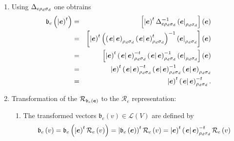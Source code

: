 \documentclass[aps,preprint]{revtex4}
\begin{document}
\begin{enumerate}
\item Using ${\Large \Delta }_{e\rho _{d}\sigma _{d}}$ one obtrains 
\begin{eqnarray}
\mathfrak{b}_{e}\left( \left\vert \boldsymbol{e}\right) ^{t}\right) &=&\left[
\left\vert \boldsymbol{e}\right) ^{t}{\large \Delta }_{e\rho _{d}\sigma
_{d}}^{\boldsymbol{-}1}\left( \boldsymbol{e}\right\vert _{\rho _{d}\sigma
_{d}}\right] \left( \boldsymbol{e}\right) \\
&=&\left[ \left\vert \boldsymbol{e}\right) ^{t}\left( \left( \left. 
\boldsymbol{e}\right\vert \boldsymbol{e}\right) _{\rho _{d}\sigma
_{d}}\left( \left. \boldsymbol{e}\right\vert \boldsymbol{e}\right) _{\rho
_{d}\sigma _{d}}^{t}\right) ^{-1}\left( \boldsymbol{e}\right\vert _{\rho
_{d}\sigma _{d}}\right] \left( \boldsymbol{e}\right) \\
&=&\left[ \left\vert \boldsymbol{e}\right) ^{t}\left( \left. \boldsymbol{e}%
\right\vert \boldsymbol{e}\right) _{\rho _{d}\sigma _{d}}^{-t}\left( \left. 
\boldsymbol{e}\right\vert \boldsymbol{e}\right) _{\rho _{d}\sigma
_{d}}^{-1}\left( \boldsymbol{e}\right\vert _{\rho _{d}\sigma _{d}}\right]
\left( \boldsymbol{e}\right) \\
&=&\left\vert \boldsymbol{e}\right) ^{t}\left( \left. \boldsymbol{e}%
\right\vert \boldsymbol{e}\right) _{\rho _{d}\sigma _{d}}^{-t}\left( \left. 
\boldsymbol{e}\right\vert \boldsymbol{e}\right) _{\rho _{d}\sigma
_{d}}^{-1}\left( \left. \boldsymbol{e}\right\vert \boldsymbol{e}\right)
_{\rho _{d}\sigma _{d}} \\
&=&\left\vert \boldsymbol{e}\right) ^{t}\left( \left. \boldsymbol{e}%
\right\vert \boldsymbol{e}\right) _{\rho _{d}\sigma _{d}}^{-t}.
\end{eqnarray}

\item Transformation of the $\mathcal{R}_{\mathfrak{b}_{e}\left( \boldsymbol{%
e}\right) }$ to the $\mathcal{R}_{e}$ representation:

\begin{enumerate}
\item The transformed vectors $\mathfrak{b}_{e}\left( v\right) \in \mathcal{L%
}\left( V\right) $ are defined by 
\begin{equation}
\mathfrak{b}_{e}\left( v\right) =\mathfrak{b}_{e}\left( \overset{}{%
\left\vert \boldsymbol{e}\right) ^{t}\mathcal{R}_{e}\left( v\right) }\right)
=\left\vert \mathfrak{b}_{e}\left( \boldsymbol{e}\right) \right) ^{t}%
\mathcal{R}_{e}\left( v\right) =\left\vert \boldsymbol{e}\right) ^{t}\left(
\left. \boldsymbol{e}\right\vert \boldsymbol{e}\right) _{\rho _{d}\sigma
_{d}}^{-t}\mathcal{R}_{e}\left( v\right)
\end{equation}


\end{enumerate}
\end{enumerate}
\end{document}

